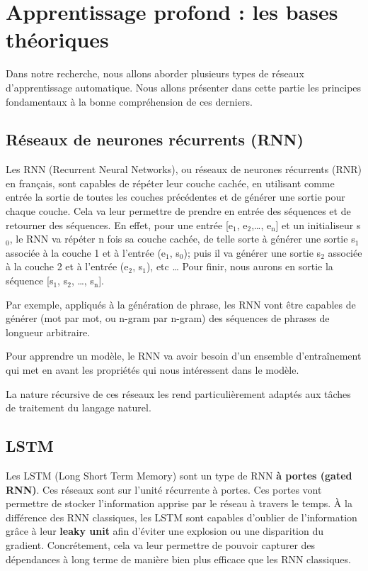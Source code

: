 \documentclass[11pt]{article}
\begin{document}
\section{Apprentissage profond : les bases théoriques}
\label{sec:org5f19609}
Dans notre recherche, nous allons aborder plusieurs types de réseaux d'apprentissage automatique.
Nous allons présenter dans cette partie les principes fondamentaux à la bonne compréhension de ces derniers.

\subsection{Réseaux de neurones récurrents (RNN)}
\label{sec:org0c88cc6}
Les RNN (Recurrent Neural Networks), ou réseaux de neurones récurrents (RNR) en français, sont capables de répéter leur couche cachée, en utilisant comme entrée la sortie de toutes les couches précédentes et de générer une sortie pour chaque couche. 
Cela va leur permettre de prendre en entrée des séquences et de retourner des séquences.
En effet, pour une entrée [e\(_{\text{1}}\), e\(_{\text{2}}\),\ldots{}, e\(_{\text{n}}\)] et un initialiseur s\(_{\text{0}}\), le RNN va répéter n fois sa couche cachée, de telle sorte à générer une sortie s\(_{\text{1}}\) associée à la couche 1 et à l'entrée (e\(_{\text{1}}\), s\(_{\text{0}}\)); puis il va générer une sortie s\(_{\text{2}}\) associée à la couche 2 et à l'entrée (e\(_{\text{2}}\), s\(_{\text{1}}\)), etc \ldots{}
Pour finir, nous aurons en sortie la séquence [s\(_{\text{1}}\), s\(_{\text{2}}\), \ldots{}, s\(_{\text{n}}\)].

Par exemple, appliqués à la génération de phrase, les RNN vont être capables de générer (mot par mot, ou n-gram par n-gram) des séquences de phrases de longueur arbitraire.

Pour apprendre un modèle, le RNN va avoir besoin d'un ensemble d'entraînement qui met en avant les propriétés qui nous intéressent dans le modèle.

La nature récursive de ces réseaux les rend particulièrement adaptés aux tâches de traitement du langage naturel.

\subsection{LSTM}
\label{sec:orgedcdbad}
Les LSTM (Long Short Term Memory) sont un type de RNN \textbf{à portes (gated RNN)}. Ces réseaux sont sur l'unité récurrente à portes. 
Ces portes vont permettre de stocker l'information apprise par le réseau à travers le temps. 
À la différence des RNN classiques, les LSTM sont capables d'oublier de l'information grâce à leur \textbf{leaky unit} afin d'éviter une explosion ou une disparition du gradient.
Concrétement, cela va leur permettre de pouvoir capturer des dépendances à long terme de manière bien plus efficace que les RNN classiques.
\end{document}
